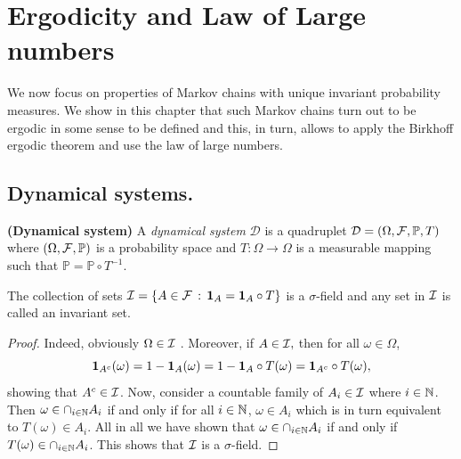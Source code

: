 \documentclass[english,graybox,envcountchap,envcountsame,sectrefs,shortlabels]{svmono}
\theoremstyle{style}
\renewenvironment{keywords}{\textit{\bf Keywords: } \sffamily }{}
\begin{document}
%
%
%

\chapter{Ergodicity and Law of Large numbers}
\minitoc

We now focus on properties of Markov chains with unique invariant probability measures.
We show in this chapter that such Markov chains turn out to be ergodic
in some sense to be defined and this, in turn, allows to apply the
Birkhoff ergodic theorem and use the law of large numbers.


\section{Dynamical systems.}


\begin{definition}
\textbf{(Dynamical system)} A \emph{dynamical system} $\mathcal{D}$
is a quadruplet $\mathcal{D}=(\Omega,\mathcal{F},\mathbb{P},T)$ where $(\Omega,\mathcal{F},\mathbb{P})$
is a probability space and $T:\Omega\rightarrow\Omega$ is a measurable
mapping such that $\mathbb{P}=\mathbb{P}\circ T^{-1}$.
\end{definition}

\begin{lemma}
The collection of sets $\mathcal{I}=\left\{ A\in\mathcal{F}\,:\,\mathbf{1}_{A}=\mathbf{1}_{A}\circ T\right\}$
is a $\sigma$-field and any set in $\mathcal{I}$ is called an invariant set. 
\end{lemma}
\begin{proof}
Indeed, obviously $\Omega\in\mathcal{I}$ . Moreover, if $A\in\mathcal{I},$ then
for all $\omega\in\Omega$,
\[
\mathbf{1}_{A^{c}}(\omega)=1-\mathbf{1}_{A}(\omega)=1-\mathbf{1}_{A}\circ T(\omega)=\mathbf{1}_{A^{c}}\circ T(\omega),
\]
showing that $A^{c}\in\mathcal{I}$. Now, consider a countable family of
$A_{i}\in\mathcal{I}$ where $i\in\mathbb{N}$. Then $\omega\in\cap_{i\in\mathbb{N}}A_{i}$
if and only if for all $i\in\mathbb{N}$, $\omega\in A_{i}$ which is in
turn equivalent to $T(\omega)\in A_{i}$. All in all we have shown
that $\omega\in\cap_{i\in\mathbb{N}}A_{i}$ if and only if $T(\omega)\in\cap_{i\in\mathbb{N}}A_{i}$.
This shows that $\mathcal{I}$ is a $\sigma$-field.
\end{proof}
\end{document}

